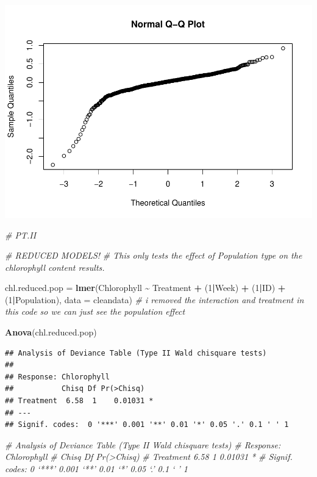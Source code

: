 \documentclass[
]{article}
\newenvironment{Shaded}{\begin{snugshade}}{\end{snugshade}}
\newcommand{\AttributeTok}[1]{\textcolor[rgb]{0.13,0.29,0.53}{#1}}
\newcommand{\CommentTok}[1]{\textcolor[rgb]{0.56,0.35,0.01}{\textit{#1}}}
\newcommand{\DecValTok}[1]{\textcolor[rgb]{0.00,0.00,0.81}{#1}}
\newcommand{\FunctionTok}[1]{\textcolor[rgb]{0.13,0.29,0.53}{\textbf{#1}}}
\newcommand{\NormalTok}[1]{#1}
\newcommand{\OtherTok}[1]{\textcolor[rgb]{0.56,0.35,0.01}{#1}}
\newcommand{\SpecialCharTok}[1]{\textcolor[rgb]{0.81,0.36,0.00}{\textbf{#1}}}
\begin{document}
\includegraphics{../Output/unnamed-chunk-10-1.pdf}

\begin{Shaded}
\begin{Highlighting}[]
\CommentTok{\# PT.II   }

\CommentTok{\# REDUCED MODELS!   }
\CommentTok{\# This only tests the effect of Population type on the chlorophyll content results.  }

\NormalTok{chl.reduced.pop }\OtherTok{=} \FunctionTok{lmer}\NormalTok{(Chlorophyll }\SpecialCharTok{\textasciitilde{}}\NormalTok{ Treatment }\SpecialCharTok{+}\NormalTok{ (}\DecValTok{1}\SpecialCharTok{|}\NormalTok{Week) }\SpecialCharTok{+}\NormalTok{ (}\DecValTok{1}\SpecialCharTok{|}\NormalTok{ID) }\SpecialCharTok{+}\NormalTok{ (}\DecValTok{1}\SpecialCharTok{|}\NormalTok{Population), }\AttributeTok{data =}\NormalTok{ cleandata) }
\CommentTok{\# i removed the interaction and treatment in this code so we can just see the population effect}

\FunctionTok{Anova}\NormalTok{(chl.reduced.pop)}
\end{Highlighting}
\end{Shaded}

\begin{verbatim}
## Analysis of Deviance Table (Type II Wald chisquare tests)
## 
## Response: Chlorophyll
##           Chisq Df Pr(>Chisq)  
## Treatment  6.58  1    0.01031 *
## ---
## Signif. codes:  0 '***' 0.001 '**' 0.01 '*' 0.05 '.' 0.1 ' ' 1
\end{verbatim}

\begin{Shaded}
\begin{Highlighting}[]
\CommentTok{\# Analysis of Deviance Table (Type II Wald chisquare tests)}
\CommentTok{\# Response: Chlorophyll}
          \CommentTok{\# Chisq Df Pr(\textgreater{}Chisq)  }
\CommentTok{\# Treatment  6.58  1    0.01031 *}
\CommentTok{\# Signif. codes:  0 ‘***’ 0.001 ‘**’ 0.01 ‘*’ 0.05 ‘.’ 0.1 ‘ ’ 1}
\end{Highlighting}
\end{Shaded}
\end{document}
